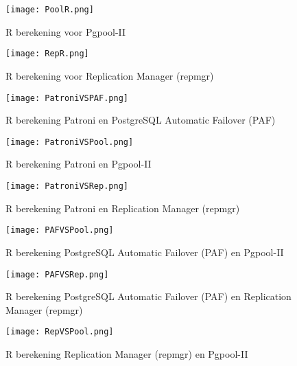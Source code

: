 \begin{figure}[!h]
    \centering
    \texttt{[image: PoolR.png]}
    \caption{R berekening voor Pgpool-II}
    \label{fig:R berekening voor Pgpool-II}
\end{figure}

\begin{figure}[!h]
    \centering
    \texttt{[image: RepR.png]}
    \caption{R berekening voor Replication Manager (repmgr)}
    \label{fig:R berekening voor Replication Manager (repmgr)}
\end{figure}

\begin{figure}[!h]
    \centering
    \texttt{[image: PatroniVSPAF.png]}
    \caption{R berekening Patroni en PostgreSQL Automatic Failover (PAF)}
    \label{fig:R berekening Patroni en PostgreSQL Automatic Failover (PAF)}
\end{figure}

\begin{figure}[!h]
    \centering
    \texttt{[image: PatroniVSPool.png]}
    \caption{R berekening Patroni en Pgpool-II}
    \label{fig:R berekening Patroni en Pgpool-II}
\end{figure}

\begin{figure}[!h]
    \centering
    \texttt{[image: PatroniVSRep.png]}
    \caption{R berekening Patroni en Replication Manager (repmgr)}
    \label{fig:R berekening Patroni en Replication Manager (repmgr)}
\end{figure}

\begin{figure}[!h]
    \centering
    \texttt{[image: PAFVSPool.png]}
    \caption{R berekening PostgreSQL Automatic Failover (PAF) en Pgpool-II}
    \label{fig:R berekening PostgreSQL Automatic Failover (PAF) en Pgpool-II}
\end{figure}

\begin{figure}[!h]
    \centering
    \texttt{[image: PAFVSRep.png]}
    \caption{R berekening PostgreSQL Automatic Failover (PAF) en Replication Manager (repmgr)}
    \label{fig:R berekening PostgreSQL Automatic Failover (PAF) en Replication Manager (repmgr)}
\end{figure}

\begin{figure}[!h]
    \centering
    \texttt{[image: RepVSPool.png]}
    \caption{R berekening Replication Manager (repmgr) en Pgpool-II}
    \label{fig:R berekening Replication Manager (repmgr) en Pgpool-II}
\end{figure}



